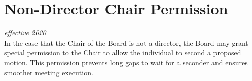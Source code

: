 \section{Non-Director Chair Permission}
\emph{effective 2020}\\

In the case that the Chair of the Board is not a director, the Board may grant special permission to the Chair to allow the individual to second a proposed motion.
This permission prevents long gaps to wait for a seconder and ensures smoother meeting execution. 